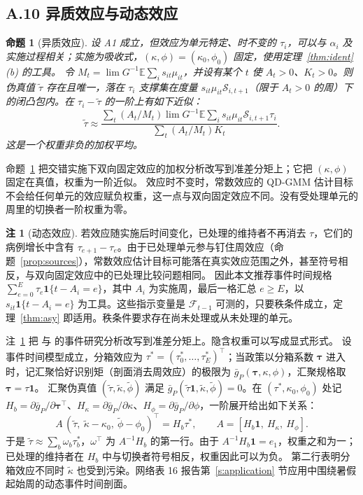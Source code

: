 \documentclass[11pt,a4paper]{ctexart}
\newtheorem{proposition}{命题}
\theoremstyle{definition}
\newtheorem{remark}{注}
\newcommand{\E}{\mathbb{E}}
\newcommand{\F}{\mathcal{F}}
\newcommand{\ind}{\mathbf{1}}
\newcommand{\Sw}{\mathcal{S}}
\begin{document}
\subsection*{A.10 异质效应与动态效应}

\begin{proposition}[异质效应]
\label{prop:hetero}
设 A1 成立，但效应为单元特定、时不变的 $\tau_i$，可以与 $\alpha_i$ 及实施过程相关；实施为吸收式，$(\kappa,\phi)=(\kappa_0,\phi_0)$ 固定，使用定理~\ref{thm:ident}(b) 的工具。
令 $M_t=\lim G^{-1}\E\sum_i s_{it}\mu_{it}$，并设有某个 $t$ 使 $A_t>0$、$K_t>0$。则伪真值 $\tilde\tau$ 存在且唯一，落在 $\tau_i$ 支撑集在度量 $s_{it}\mu_{it}\Sw_{i,t+1}$（限于 $A_t>0$ 的周）下的闭凸包内。在 $\tau_i-\tilde\tau$ 的一阶上有如下近似：
\[
\tilde\tau\approx\frac{\sum_t(A_t/M_t)\lim G^{-1}\E\sum_i s_{it}\mu_{it}\Sw_{i,t+1}\tau_i}{\sum_t(A_t/M_t)K_t}.
\]
这是一个权重非负的加权平均。
\end{proposition}

命题~\ref{prop:hetero} 把交错实施下双向固定效应的加权分析\citep{goodmanbacon2021did,dechaisemartin2020twfe}改写到准差分矩上；它把 $(\kappa,\phi)$ 固定在真值，权重为一阶近似。
效应时不变时，常数效应的 QD-GMM 估计目标不会给任何单元的效应赋负权重，这一点与双向固定效应不同。没有受处理单元的周里的切换者一阶权重为零。

\setcounter{remark}{1}
\begin{remark}[动态效应]
\label{rem:dynamic}
若效应随实施后时间变化，已处理的维持者不再消去 $\tau$，它们的病例增长中含有 $\tau_{e+1}-\tau_e$。由于已处理单元参与钉住周效应（命题~\ref{prop:sources}），常数效应估计目标可能落在真实效应范围之外，甚至符号相反，与双向固定效应中的已处理比较问题相同\citep{goodmanbacon2021did}。
因此本文推荐事件时间规格 $\sum_{e=0}^{E}\tau_e\ind\{t-A_i=e\}$，其中 $A_i$ 为实施周，最后一格汇总 $e\ge E$，以 $s_{it}\ind\{t-A_i=e\}$ 为工具。这些指示变量是 $\F_{t-1}$ 可测的，只要秩条件成立，定理~\ref{thm:asy} 即适用。秩条件要求存在尚未处理或从未处理的单元。
\end{remark}

注~\ref{rem:dynamic} 把\citet{sun2021estimating} 与\citet{borusyak2024imputation} 的事件研究分析改写到准差分矩上。隐含权重可以写成显式形式。
设事件时间模型成立，分箱效应为 $\tau^*=(\tau^*_0,\dots,\tau^*_E)^{\top}$；当政策以分箱系数 $\boldsymbol\tau$ 进入时，记汇聚恰好识别矩（剖面消去周效应）的极限为 $\bar g_P(\boldsymbol\tau,\kappa,\phi)$，汇聚规格取 $\boldsymbol\tau=\tau\mathbf 1$。
汇聚伪真值 $(\tilde\tau,\tilde\kappa,\tilde\phi)$ 满足 $\bar g_P(\tilde\tau\mathbf 1,\tilde\kappa,\tilde\phi)=0$。在 $(\tau^*,\kappa_0,\phi_0)$ 处记 $H_b=\partial\bar g_P/\partial\boldsymbol\tau^{\top}$、$H_\kappa=\partial\bar g_P/\partial\kappa$、$H_\phi=\partial\bar g_P/\partial\phi$，一阶展开给出如下关系：
\[
A\,(\tilde\tau,\ \tilde\kappa-\kappa_0,\ \tilde\phi-\phi_0)^{\top}=H_b\tau^*,\qquad
A=[H_b\mathbf 1,\ H_\kappa,\ H_\phi].
\]
于是 $\tilde\tau\approx\sum_{b}\omega_b\tau^*_b$，$\omega^{\top}$ 为 $A^{-1}H_b$ 的第一行。由于 $A^{-1}H_b\mathbf 1=e_1$，权重之和为一；已处理的维持者在 $H_b$ 中与切换者符号相反，权重因此可以为负。
第二行表明分箱效应不同时 $\tilde\kappa$ 也受到污染。网络表 16 报告第~\ref{s:application} 节应用中围绕暑假起始周的动态事件时间剖面。
\end{document}
